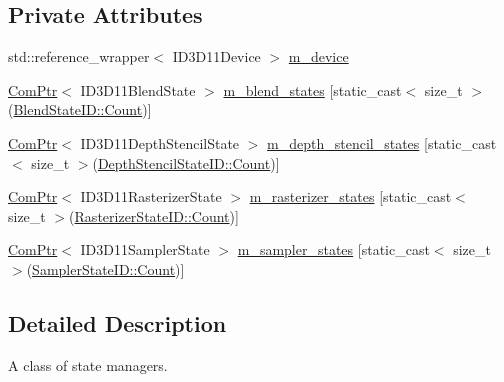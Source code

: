 \subsection*{Private Attributes}
\begin{DoxyCompactItemize}
\item 
std\+::reference\+\_\+wrapper$<$ I\+D3\+D11\+Device $>$ \hyperlink{classmage_1_1rendering_1_1_state_manager_abfe78953d7404fc86e85531ac296281b}{m\+\_\+device}
\item 
\hyperlink{namespacemage_ae74f374780900893caa5555d1031fd79}{Com\+Ptr}$<$ I\+D3\+D11\+Blend\+State $>$ \hyperlink{classmage_1_1rendering_1_1_state_manager_ad72e83edb0b28b1f03cf8a7dc231587e}{m\+\_\+blend\+\_\+states} \mbox{[}static\+\_\+cast$<$ size\+\_\+t $>$(\hyperlink{namespacemage_1_1rendering_abdf11cdb816b9208aec6c3a81f7564abae93f994f01c537c4e2f7d8528c3eb5e9}{Blend\+State\+I\+D\+::\+Count})\mbox{]}
\item 
\hyperlink{namespacemage_ae74f374780900893caa5555d1031fd79}{Com\+Ptr}$<$ I\+D3\+D11\+Depth\+Stencil\+State $>$ \hyperlink{classmage_1_1rendering_1_1_state_manager_af5deff162f3f1d102091749bfbe205b6}{m\+\_\+depth\+\_\+stencil\+\_\+states} \mbox{[}static\+\_\+cast$<$ size\+\_\+t $>$(\hyperlink{namespacemage_1_1rendering_ace195e7a068336e477080fce30f1329eae93f994f01c537c4e2f7d8528c3eb5e9}{Depth\+Stencil\+State\+I\+D\+::\+Count})\mbox{]}
\item 
\hyperlink{namespacemage_ae74f374780900893caa5555d1031fd79}{Com\+Ptr}$<$ I\+D3\+D11\+Rasterizer\+State $>$ \hyperlink{classmage_1_1rendering_1_1_state_manager_a2d97d987062db0bf6d2f91c77ecb0655}{m\+\_\+rasterizer\+\_\+states} \mbox{[}static\+\_\+cast$<$ size\+\_\+t $>$(\hyperlink{namespacemage_1_1rendering_ac878731f5dc22a3a36ccfbfc77c3facaae93f994f01c537c4e2f7d8528c3eb5e9}{Rasterizer\+State\+I\+D\+::\+Count})\mbox{]}
\item 
\hyperlink{namespacemage_ae74f374780900893caa5555d1031fd79}{Com\+Ptr}$<$ I\+D3\+D11\+Sampler\+State $>$ \hyperlink{classmage_1_1rendering_1_1_state_manager_ac0d76e363936a196acc6fafa09acc73d}{m\+\_\+sampler\+\_\+states} \mbox{[}static\+\_\+cast$<$ size\+\_\+t $>$(\hyperlink{namespacemage_1_1rendering_a6f80181126db61dbb8b528a6894eb658ae93f994f01c537c4e2f7d8528c3eb5e9}{Sampler\+State\+I\+D\+::\+Count})\mbox{]}
\end{DoxyCompactItemize}


\subsection{Detailed Description}
A class of state managers. 

